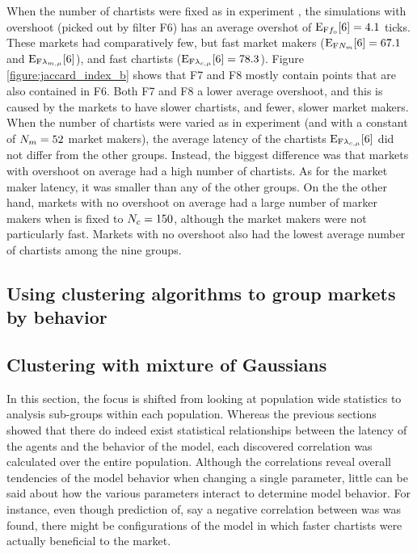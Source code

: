 When the number of chartists were fixed as in experiment \dten, the simulations with overshoot (picked out by filter F6) has an average overshot of $\mathrm{E}_\text{F{\ensuremath{f_\text{o}}}}[6] = 4.1$ ticks. These markets had comparatively few, but fast market makers ($\mathrm{E}_\text{F{\ensuremath{N_{m}}}}[6] = 67.1$ and $\mathrm{E}_\text{F{\ensuremath{\lambda_{m, \mu}}}}[6]$), and fast chartists ($\mathrm{E}_\text{F{\ensuremath{\lambda_{c, \mu}}}}[6] = 78.3$). Figure \ref{figure:jaccard_index_b} shows that F7 and F8 mostly contain points that are also contained in F6. Both F7 and F8 a lower average overshoot, and this is caused by the markets to have slower chartists, and fewer, slower market makers. When the number of chartists were varied as in experiment \deleven{} (and with a constant of $N_{m}=52$ market makers), the average latency of the chartists $\mathrm{E}_\text{F{\ensuremath{\lambda_{c, \mu}}}}[6]$ did not differ from the other groups. Instead, the biggest difference was that markets with overshoot on average had a high number of chartists. As for the market maker latency, it was smaller than any of the other groups. On the the other hand, markets with no overshoot on average had a large number of marker makers when \scnAgents is fixed to $N_{c} = 150$, although the market makers were not particularly fast. Markets with no overshoot also had the lowest average number of chartists among the nine groups.

\subsection{Using clustering algorithms to group markets by behavior}\label{section:clustering}

\subsection{Clustering with mixture of Gaussians}
In this section, the focus is shifted from looking at population wide statistics to analysis sub-groups within each population. Whereas the previous sections showed that there do indeed exist statistical relationships between the latency of the agents and the behavior of the model, each discovered correlation was calculated over the entire population. Although the correlations reveal overall tendencies of the model behavior when changing a single parameter, little can be said about how the various parameters interact to determine model behavior. For instance, even though prediction of, say a negative correlation between \timetoreachnewfundamental was \sclatencymu was found, there might be configurations of the model in which faster chartists were actually beneficial to the market. 

